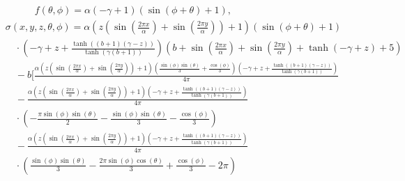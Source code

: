 \documentclass[ms,cpyr,lof,lot]{uathesis}
\begin{document}
\begin{align}
  &\quad\qquad f(\theta, \phi) = \alpha \left(- \gamma + 1\right) \left(\sin{\left (\phi + \theta \right )} + 1\right),
  \label{eqn:mms_bc_expr} \\
  &\sigma(x, y, z, \theta, \phi) = \alpha \left(z \left(\sin{\left (\frac{2 \pi x}{\alpha} \right )} + \sin{\left (\frac{2 \pi y}{\alpha} \right )}\right) + 1\right) \left(\sin{\left (\phi + \theta \right )} + 1\right) \nonumber\\
  &\quad \cdot \left(- \gamma + z + \frac{\tanh{\left (\left(b + 1\right) \left(\gamma - z\right) \right )}}{\tanh{\left (\gamma \left(b + 1\right) \right )}}\right) \left(b + \sin{\left (\frac{2 \pi x}{\alpha} \right )} + \sin{\left (\frac{2 \pi y}{\alpha} \right )} + \tanh{\left (- \gamma + z \right )} + 5\right) \nonumber\\
  &\quad - b \Bigg[ \frac{\alpha \left(z \left(\sin{\left (\frac{2 \pi x}{\alpha} \right )} + \sin{\left (\frac{2 \pi y}{\alpha} \right )}\right) + 1\right) \left(\frac{\sin{\left (\phi \right )} \sin{\left (\theta \right )}}{3} + \frac{\cos{\left (\phi \right )}}{3}\right) \left(- \gamma + z + \frac{\tanh{\left (\left(b + 1\right) \left(\gamma - z\right) \right )}}{\tanh{\left (\gamma \left(b + 1\right) \right )}}\right)}{4 \pi} \nonumber\\
  &\quad - \frac{\alpha \left(z \left(\sin{\left (\frac{2 \pi x}{\alpha} \right )} + \sin{\left (\frac{2 \pi y}{\alpha} \right )}\right) + 1\right) \left(- \gamma + z + \frac{\tanh{\left (\left(b + 1\right) \left(\gamma - z\right) \right )}}{\tanh{\left (\gamma \left(b + 1\right) \right )}}\right)}{4 \pi} \nonumber\\
    &\quad \cdot \left(-\frac{\pi \sin{\left( \phi \right)}\sin{\left( \theta \right)}}{2} - \frac{\sin{\left (\phi \right )} \sin{\left (\theta \right )}}{3} - \frac{\cos{\left (\phi \right )}}{3}\right) \nonumber\\
  &\quad - \frac{\alpha \left(z \left(\sin{\left (\frac{2 \pi x}{\alpha} \right )} + \sin{\left (\frac{2 \pi y}{\alpha} \right )}\right) + 1\right) \left(- \gamma + z + \frac{\tanh{\left (\left(b + 1\right) \left(\gamma - z\right) \right )}}{\tanh{\left (\gamma \left(b + 1\right) \right )}}\right)}{4 \pi} \nonumber\\
    &\quad \cdot \left(\frac{\sin{\left( \phi \right)}\sin{\left( \theta \right)}}{3} - \frac{2 \pi \sin{\left (\phi \right )} \cos{\left (\theta \right )}}{3} + \frac{\cos{\left (\phi \right )}}{3} - 2 \pi\right) \nonumber\\

\end{align}
\end{document}
